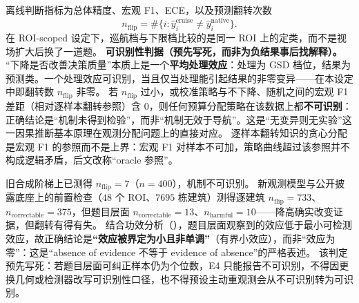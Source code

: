 离线判断指标为总体精度、宏观 F1、ECE，以及预测翻转次数
\begin{equation}
n_{\mathrm{flip}}=\#\{i: \hat y_i^{\mathrm{cruise}}\neq \hat y_i^{\mathrm{native}}\}.
\end{equation}
在 ROI-scoped 设定下，巡航档与下限档比较的是同一 ROI 上的定类，而不是视场扩大后换了一道题。
\textbf{可识别性判据（预先写死，而非为负结果事后找解释）。}
``下降是否改善决策质量''本质上是一个\textbf{平均处理效应}：处理为 GSD 档位，结果为预测类。一个处理效应可识别，当且仅当处理能引起结果的非零变异——在本设定中即翻转数 $n_{\mathrm{flip}}$ 非零。
若 $n_{\mathrm{flip}}$ 过小，或校准策略与不下降、随机之间的宏观 F1 差距（相对逐样本翻转参照）含 0，则任何预算分配策略在该数据上都\textbf{不可识别}：正确结论是``机制未得到检验''，而非``机制无效于导航''。这是``无变异则无实验''这一因果推断基本原理在观测分配问题上的直接对应。
逐样本翻转知识的贪心分配是宏观 F1 的参照而不是上界：宏观 F1 对样本不可加，策略曲线超过该参照并不构成逻辑矛盾，后文改称``oracle 参照''。

旧合成阶梯上已测得 $n_{\mathrm{flip}}=7$（$n=400$），机制不可识别。
新观测模型与公开披露底座上的前置检查（$48$ 个 ROI、$7695$ 栋建筑）测得逐建筑 $n_{\mathrm{flip}}=733$、$n_{\mathrm{correctable}}=375$，但题目层面 $n_{\mathrm{correctable}}=13$、$n_{\mathrm{harmful}}=10$——降高确实改变证据，但翻转有得有失。
结合功效分析（），题目层面观察到的效应低于最小可检测效应，故正确结论是\textbf{``效应被界定为小且非单调''}（有界小效应），而非``效应为零''：这是``absence of evidence 不等于 evidence of absence''的严格表述。
该判定预先写死：若题目层面可纠正样本仍为个位数，E4 只能报告不可识别，不得因更换几何或检测器改写可识别性口径，也不得预设主动重观测会从不可识别转为可识别。
